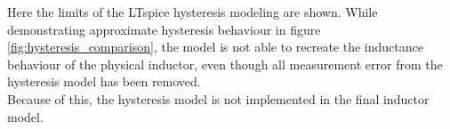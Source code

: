 Here the limits of the LTspice hysteresis modeling are shown. While demonstrating approximate hysteresis behaviour in figure \ref{fig:hysteresis_comparison}, the model is not able to recreate the inductance behaviour of the physical inductor, even though all measurement error from the hysteresis model has been removed.\\
Because of this, the hysteresis model is not implemented in the final inductor model.







